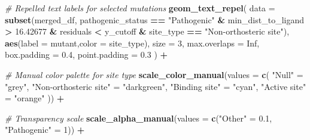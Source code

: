 \documentclass[
]{article}
\newenvironment{Shaded}{\begin{snugshade}}{\end{snugshade}}
\newcommand{\AttributeTok}[1]{\textcolor[rgb]{0.13,0.29,0.53}{#1}}
\newcommand{\CommentTok}[1]{\textcolor[rgb]{0.56,0.35,0.01}{\textit{#1}}}
\newcommand{\ConstantTok}[1]{\textcolor[rgb]{0.56,0.35,0.01}{#1}}
\newcommand{\DecValTok}[1]{\textcolor[rgb]{0.00,0.00,0.81}{#1}}
\newcommand{\FloatTok}[1]{\textcolor[rgb]{0.00,0.00,0.81}{#1}}
\newcommand{\FunctionTok}[1]{\textcolor[rgb]{0.13,0.29,0.53}{\textbf{#1}}}
\newcommand{\NormalTok}[1]{#1}
\newcommand{\OtherTok}[1]{\textcolor[rgb]{0.56,0.35,0.01}{#1}}
\newcommand{\SpecialCharTok}[1]{\textcolor[rgb]{0.81,0.36,0.00}{\textbf{#1}}}
\newcommand{\StringTok}[1]{\textcolor[rgb]{0.31,0.60,0.02}{#1}}
\begin{document}
\begin{Shaded}
\begin{Highlighting}[]
  \CommentTok{\# Repelled text labels for selected mutations}
  \FunctionTok{geom\_text\_repel}\NormalTok{(}
    \AttributeTok{data =} \FunctionTok{subset}\NormalTok{(merged\_df, pathogenic\_status }\SpecialCharTok{==} \StringTok{"Pathogenic"} \SpecialCharTok{\&}\NormalTok{ min\_dist\_to\_ligand }\SpecialCharTok{\textgreater{}} \FloatTok{16.42677} \SpecialCharTok{\&}\NormalTok{ residuals }\SpecialCharTok{\textless{}}\NormalTok{ y\_cutoff }\SpecialCharTok{\&}\NormalTok{ site\_type }\SpecialCharTok{==} \StringTok{"Non{-}orthosteric site"}\NormalTok{),}
    \FunctionTok{aes}\NormalTok{(}\AttributeTok{label =}\NormalTok{ mutant,}\AttributeTok{color =}\NormalTok{ site\_type),}
    \AttributeTok{size =} \DecValTok{3}\NormalTok{, }
    \AttributeTok{max.overlaps =} \ConstantTok{Inf}\NormalTok{, }\AttributeTok{box.padding =} \FloatTok{0.4}\NormalTok{, }\AttributeTok{point.padding =} \FloatTok{0.3}
\NormalTok{  ) }\SpecialCharTok{+}
  
  \CommentTok{\# Manual color palette for site type}
  \FunctionTok{scale\_color\_manual}\NormalTok{(}\AttributeTok{values =} \FunctionTok{c}\NormalTok{(}
    \StringTok{"Null"} \OtherTok{=} \StringTok{"grey"}\NormalTok{,}
    \StringTok{"Non{-}orthosteric site"} \OtherTok{=} \StringTok{"darkgreen"}\NormalTok{,}
    \StringTok{"Binding site"} \OtherTok{=} \StringTok{"cyan"}\NormalTok{,}
    \StringTok{"Active site"} \OtherTok{=} \StringTok{"orange"}
\NormalTok{  )) }\SpecialCharTok{+}
  
  \CommentTok{\# Transparency scale}
  \FunctionTok{scale\_alpha\_manual}\NormalTok{(}\AttributeTok{values =} \FunctionTok{c}\NormalTok{(}\StringTok{"Other"} \OtherTok{=} \FloatTok{0.1}\NormalTok{, }\StringTok{"Pathogenic"} \OtherTok{=} \DecValTok{1}\NormalTok{)) }\SpecialCharTok{+}
  

\end{Highlighting}
\end{Shaded}
\end{document}
